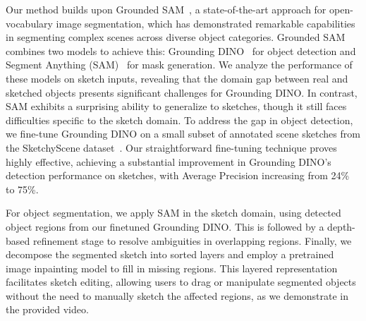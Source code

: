 Our method builds upon Grounded SAM~\cite{ren2024grounded}, a state-of-the-art approach for open-vocabulary image segmentation, which has demonstrated remarkable capabilities in segmenting complex scenes across diverse object categories. Grounded SAM combines two models to achieve this: Grounding DINO~\cite{liu2023grounding} for object detection and Segment Anything (SAM)~\cite{kirillov2023segany} for mask generation. We analyze the performance of these models on sketch inputs, revealing that the domain gap between real and sketched objects presents significant challenges for Grounding DINO. In contrast, SAM exhibits a surprising ability to generalize to sketches, though it still faces difficulties specific to the sketch domain.
To address the gap in object detection, we fine-tune Grounding DINO on
a small subset of annotated scene sketches from the SketchyScene
dataset~\cite{Zou18SketchyScene}.
Our straightforward fine-tuning technique proves highly effective, achieving a substantial improvement in Grounding DINO's detection performance on sketches, with Average Precision increasing from 24\% to 75\%.

For object segmentation, we apply SAM \cite{kirillov2023segany} in the sketch domain, using detected object regions from our finetuned Grounding DINO. This is followed by a depth-based refinement stage to resolve ambiguities in overlapping regions.
Finally, we decompose the segmented sketch into sorted layers and employ a pretrained image inpainting model  to fill in missing regions. This layered representation facilitates sketch editing, allowing users to drag or manipulate segmented objects without the need to manually sketch the affected regions, as we demonstrate in the provided video.


